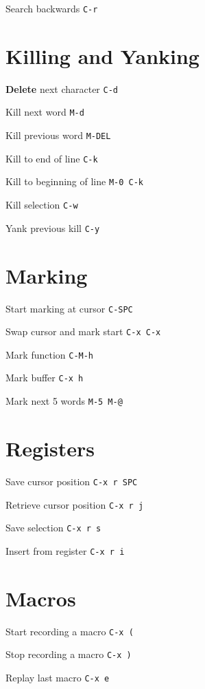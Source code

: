 \documentclass[12pt,a4paper]{article}
\newcommand{\keyboardshortcut}[2]{#1 \hfill \texttt{#2}}
\begin{document}
\keyboardshortcut{Search backwards}{C-r}


\section*{Killing and Yanking}

\keyboardshortcut{\textbf{Delete} next character}{C-d}

\keyboardshortcut{Kill next word}{M-d}

\keyboardshortcut{Kill previous word}{M-DEL}

\keyboardshortcut{Kill to end of line}{C-k}

\keyboardshortcut{Kill to beginning of line}{M-0 C-k}

\keyboardshortcut{Kill selection}{C-w}

\keyboardshortcut{Yank previous kill}{C-y}


\section*{Marking}

\keyboardshortcut{Start marking at cursor}{C-SPC}

\keyboardshortcut{Swap cursor and mark start}{C-x C-x}

\keyboardshortcut{Mark function}{C-M-h}

\keyboardshortcut{Mark buffer}{C-x h}

\keyboardshortcut{Mark next 5 words}{M-5 M-@}

\section*{Registers}

\keyboardshortcut{Save cursor position}{C-x r SPC}

\keyboardshortcut{Retrieve cursor position}{C-x r j}

\keyboardshortcut{Save selection}{C-x r s}

\keyboardshortcut{Insert from register}{C-x r i}

\section*{Macros}

\keyboardshortcut{Start recording a macro}{C-x (}

\keyboardshortcut{Stop recording a macro}{C-x )}

\keyboardshortcut{Replay last macro}{C-x e}
\end{document}
